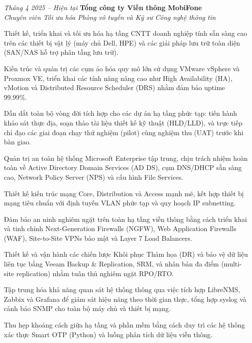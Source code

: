\begin{twocolentry}{\textit{Tháng 4 2025 -- Hiện tại}}
    \textbf{Tổng công ty Viễn thông MobiFone} \\[4pt]
    \textit{Chuyên viên Tối ưu hóa Phòng vô tuyến và Kỹ sư Công nghệ thông tin}
\end{twocolentry}
\begin{onecolentry}
    \begin{highlights}
        \item Thiết kế, triển khai và tối ưu hóa hạ tầng CNTT doanh nghiệp tính sẵn sàng cao trên các thiết bị vật lý (máy chủ Dell, HPE) và các giải pháp lưu trữ toàn diện (SAN/NAS hỗ trợ phân tầng lưu trữ).
        \item Kiến trúc và quản trị các cụm ảo hóa quy mô lớn sử dụng VMware vSphere và Proxmox VE, triển khai các tính năng nâng cao như High Availability (HA), vMotion và Distributed Resource Scheduler (DRS) nhằm đảm bảo uptime 99.99\%.
        \item Dẫn dắt toàn bộ vòng đời tích hợp cho các dự án hạ tầng phức tạp: tiến hành khảo sát thực địa, soạn thảo tài liệu thiết kế kỹ thuật (HLD/LLD), và trực tiếp chỉ đạo các giai đoạn chạy thử nghiệm (pilot) cùng nghiệm thu (UAT) trước khi bàn giao.
        \item Quản trị an toàn hệ thống Microsoft Enterprise tập trung, chịu trách nhiệm hoàn toàn về Active Directory Domain Services (AD DS), cụm DNS/DHCP sẵn sàng cao, Network Policy Server (NPS) và cấu hình File Services.
        \item Thiết kế kiến trúc mạng Core, Distribution và Access mạnh mẽ, kết hợp thiết bị mạng tiêu chuẩn với định tuyến VLAN phức tạp và quy hoạch IP subnetting.
        \item Đảm bảo an ninh nghiêm ngặt trên toàn hạ tầng viễn thông bằng cách triển khai và tinh chỉnh Next-Generation Firewalls (NGFW), Web Application Firewalls (WAF), Site-to-Site VPNs bảo mật và Layer 7 Load Balancers.
        \item Thiết kế và vận hành các chiến lược Khôi phục Thảm họa (DR) và bảo vệ dữ liệu liên tục bằng Veeam Backup \& Replication, SRM, và nhân bản đa điểm (multi-site replication) nhằm tuân thủ nghiêm ngặt RPO/RTO.
        \item Tập trung hóa khả năng quan sát hệ thống thông qua việc tích hợp LibreNMS, Zabbix và Grafana để giám sát hiệu năng theo thời gian thực, tổng hợp syslog và cảnh báo SNMP cho toàn bộ máy chủ và thiết bị mạng.
        \item Thu hẹp khoảng cách giữa hạ tầng và phần mềm bằng cách duy trì các hệ thống xác thực Smart OTP (Python) và luồng phân tích dữ liệu viễn thông.
    \end{highlights}
\end{onecolentry}
\vspace{0.2 cm}

